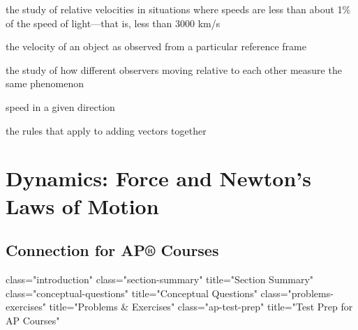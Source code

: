 \documentclass[
]{book}
\providecommand{\tightlist}{%
  \setlength{\itemsep}{0pt}\setlength{\parskip}{0pt}}
\begin{document}
\begin{description}
\tightlist
\item[classical relativity]
the study of relative velocities in situations where speeds are less
than about 1\% of the speed of light---that is, less than 3000 km/s
\end{description}

\begin{description}
\tightlist
\item[relative velocity]
the velocity of an object as observed from a particular reference
frame
\end{description}

\begin{description}
\tightlist
\item[relativity]
the study of how different observers moving relative to each other
measure the same phenomenon
\end{description}

\begin{description}
\tightlist
\item[velocity]
speed in a given direction
\end{description}

\begin{description}
\tightlist
\item[vector addition]
the rules that apply to adding vectors together
\end{description}

\hypertarget{dynamics-force-and-newtons-laws-of-motion}{%
\chapter{Dynamics: Force and Newton's Laws of Motion}\label{dynamics-force-and-newtons-laws-of-motion}}

\hypertarget{connection-for-ap-courses-2}{%
\section{Connection for AP® Courses}\label{connection-for-ap-courses-2}}

class="introduction"
class="section-summary"
title="Section Summary"
class="conceptual-questions"
title="Conceptual Questions"
class="problems-exercises"
title="Problems \& Exercises"
class="ap-test-prep" title="Test
Prep for AP Courses"
\end{document}
